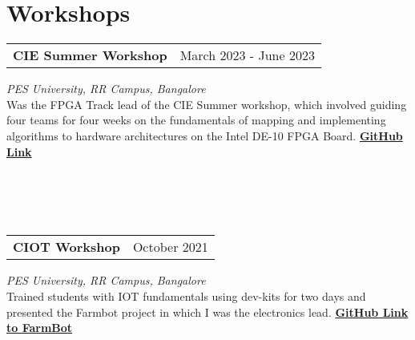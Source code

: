 \section{\sc Workshops}

\begin{tabular}{@{}p{4in}p{2in}}
  {\bf{CIE Summer Workshop}}  & March 2023 - June 2023   \\                  
\end{tabular}                                                                                                                                    
\textit{PES University, RR Campus, Bangalore} \\
Was the FPGA Track lead of the CIE Summer workshop, which involved guiding four teams for four weeks on the fundamentals of mapping and implementing algorithms to hardware architectures on the Intel DE-10 FPGA Board. \href{https://github.com/CIE-PESU/DE10_FPGA}{{\bf{GitHub Link}}}
\\
\\
\\ %
\\
\\
\begin{tabular}{@{}p{4in}p{2in}}
  {\bf{CIOT Workshop}}  & October 2021                           
\end{tabular}                 
\textit{PES University, RR Campus, Bangalore} \\
Trained students with IOT fundamentals using dev-kits for two days and presented the Farmbot project in which I was the electronics lead. \href{https://github.com/govardhnn/farmbot-pesu}{{\bf{GitHub Link to FarmBot}}}    
\endinput
